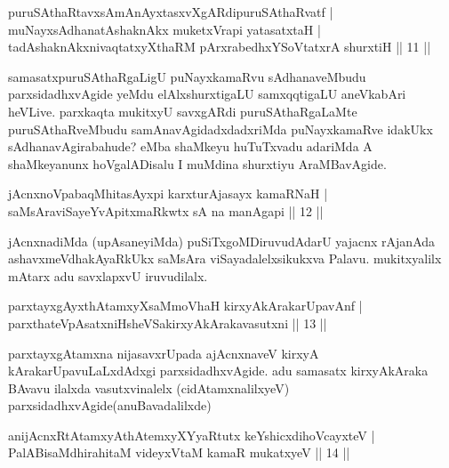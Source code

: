 \begin{shl}
puruSAthaRtavxsAmAnAyxtasxvXgARdipuruSAthaRvatf |\\
muNayxsAdhanatAshaknAkx muketxVrapi yatasatxtaH |\\
tadAshaknAkxnivaqtatxyXthaRM pArxrabedhxYSoVtatxrA shurxtiH \hfill || 11 ||
\end{shl}

\begin{artha}
samasatxpuruSAthaRgaLigU puNayxkamaRvu sAdhanaveMbudu parxsidadhxvAgide yeMdu elAlxshurxtigaLU samxqqtigaLU aneVkabAri heVLive. parxkaqta mukitxyU savxgARdi puruSAthaRgaLaMte puruSAthaRveMbudu samAnavAgidadxdadxriMda puNayxkamaRve idakUkx sAdhanavAgirabahude? eMba shaMkeyu huTuTxvadu adariMda A shaMkeyanunx hoVgalADisalu I muMdina shurxtiyu AraMBavAgide.
\end{artha}


\begin{shl}
jAcnxnoVpabaqMhitasAyxpi karxturAjasayx kamaRNaH |\\
saMsAraviSayeYvA\s \s pitxmaRkwtx sA na manAgapi \hfill || 12 ||
\end{shl}

\begin{artha}
jAcnxnadiMda (upAsaneyiMda) puSiTxgoMDiruvudAdarU yajacnx rAjanAda ashavxmeVdhakAyaRkUkx saMsAra viSayadalelxsikukxva Palavu. mukitxyalilx mAtarx adu savxlapxvU iruvudilalx.
\end{artha}


\begin{shl}
parxtayxgAyxthAtamxyXsaMmoVhaH kirxyAkArakarUpavAnf |\\
parxthateV\s pAsatxniHsheVSakirxyAkArakavasutxni \hfill || 13 ||
\end{shl}

\begin{artha}
parxtayxgAtamxna nijasavxrUpada ajAcnxnaveV kirxyA kArakarUpavuLaLxdAdxgi parxsidadhxvAgide. adu samasatx kirxyAkAraka BAvavu ilalxda vasutxvinalelx (cidAtamxnalilxyeV) parxsidadhxvAgide(anuBavadalilxde)
\end{artha}


\begin{shl}
anijAcnxRtAtamxyAthAtemxyXYyaRtutx keYshicxdihoVcayxteV |\\
PalABisaMdhirahitaM videyxVtaM kamaR mukatxyeV \hfill || 14 ||
\end{shl}

